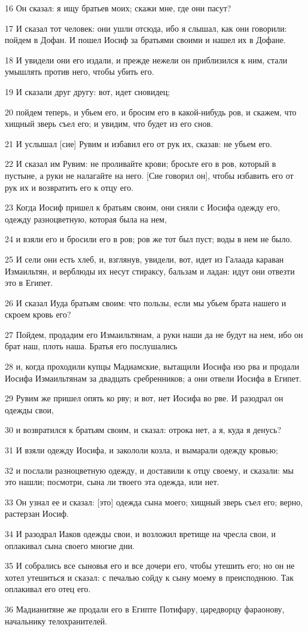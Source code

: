 \par 16 Он сказал: я ищу братьев моих; скажи мне, где они пасут?
\par 17 И сказал тот человек: они ушли отсюда, ибо я слышал, как они говорили: пойдем в Дофан. И пошел Иосиф за братьями своими и нашел их в Дофане.
\par 18 И увидели они его издали, и прежде нежели он приблизился к ним, стали умышлять против него, чтобы убить его.
\par 19 И сказали друг другу: вот, идет сновидец;
\par 20 пойдем теперь, и убьем его, и бросим его в какой-нибудь ров, и скажем, что хищный зверь съел его; и увидим, что будет из его снов.
\par 21 И услышал [сие] Рувим и избавил его от рук их, сказав: не убьем его.
\par 22 И сказал им Рувим: не проливайте крови; бросьте его в ров, который в пустыне, а руки не налагайте на него. [Сие говорил он], чтобы избавить его от рук их и возвратить его к отцу его.
\par 23 Когда Иосиф пришел к братьям своим, они сняли с Иосифа одежду его, одежду разноцветную, которая была на нем,
\par 24 и взяли его и бросили его в ров; ров же тот был пуст; воды в нем не было.
\par 25 И сели они есть хлеб, и, взглянув, увидели, вот, идет из Галаада караван Измаильтян, и верблюды их несут стираксу, бальзам и ладан: идут они отвезти это в Египет.
\par 26 И сказал Иуда братьям своим: что пользы, если мы убьем брата нашего и скроем кровь его?
\par 27 Пойдем, продадим его Измаильтянам, а руки наши да не будут на нем, ибо он брат наш, плоть наша. Братья его послушались
\par 28 и, когда проходили купцы Мадиамские, вытащили Иосифа изо рва и продали Иосифа Измаильтянам за двадцать сребренников; а они отвели Иосифа в Египет.
\par 29 Рувим же пришел опять ко рву; и вот, нет Иосифа во рве. И разодрал он одежды свои,
\par 30 и возвратился к братьям своим, и сказал: отрока нет, а я, куда я денусь?
\par 31 И взяли одежду Иосифа, и закололи козла, и вымарали одежду кровью;
\par 32 и послали разноцветную одежду, и доставили к отцу своему, и сказали: мы это нашли; посмотри, сына ли твоего эта одежда, или нет.
\par 33 Он узнал ее и сказал: [это] одежда сына моего; хищный зверь съел его; верно, растерзан Иосиф.
\par 34 И разодрал Иаков одежды свои, и возложил вретище на чресла свои, и оплакивал сына своего многие дни.
\par 35 И собрались все сыновья его и все дочери его, чтобы утешить его; но он не хотел утешиться и сказал: с печалью сойду к сыну моему в преисподнюю. Так оплакивал его отец его.
\par 36 Мадианитяне же продали его в Египте Потифару, царедворцу фараонову, начальнику телохранителей.

